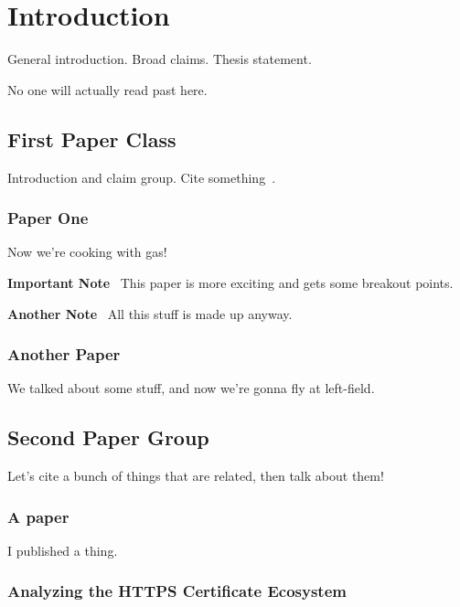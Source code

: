 \documentclass{thesis-umich}
\renewcommand{\paragraph}[1]{\medskip\noindent\textbf{#1}\,\,\,}
\begin{document}
\chapter{Introduction}

General introduction. Broad claims. Thesis statement.

No one will actually read past here.

\section{First Paper Class}

Introduction and claim group. Cite something~\cite{weakkeys12}.

\subsection{Paper One}

Now we're cooking with gas!

\paragraph{Important Note}
This paper is more exciting and gets some breakout points.

\paragraph{Another Note}
All this stuff is made up anyway.

\subsection{Another Paper}

We talked about some stuff, and now we're gonna fly at left-field.

\section{Second Paper Group}

Let's cite a bunch of things that are related, then talk about them!

\subsection{A paper}

I published a thing.

\subsection{Analyzing the HTTPS Certificate Ecosystem}
\end{document}

